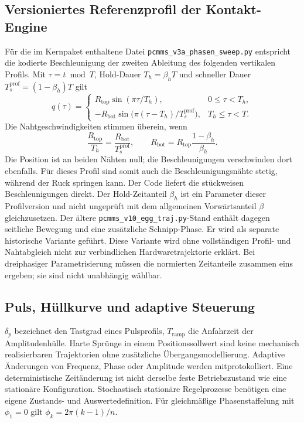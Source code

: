 \documentclass[11pt,a4paper]{article}
\begin{document}
\subsection{Versioniertes Referenzprofil der Kontakt-Engine}\label{sec:refprofil}
Für die im Kernpaket enthaltene Datei \texttt{pcmms\_v3a\_phasen\_sweep.py} entspricht die kodierte Beschleunigung der zweiten Ableitung des folgenden vertikalen Profils. Mit $\tau=t\bmod T$, Hold-Dauer $T_h=\beta_hT$ und schneller Dauer $T_s^{\mathrm{prof}}=(1-\beta_h)T$ gilt
\[
q(\tau)=\begin{cases}
R_{\mathrm{top}}\sin(\pi\tau/T_h),&0\le\tau<T_h,\\
-R_{\mathrm{bot}}\sin\bigl(\pi(\tau-T_h)/T_s^{\mathrm{prof}}\bigr),&T_h\le\tau<T.
\end{cases}
\]
Die Nahtgeschwindigkeiten stimmen überein, wenn
\[
\frac{R_{\mathrm{top}}}{T_h}=\frac{R_{\mathrm{bot}}}{T_s^{\mathrm{prof}}},\qquad
R_{\mathrm{bot}}=R_{\mathrm{top}}\frac{1-\beta_h}{\beta_h}.
\]
Die Position ist an beiden Nähten null; die Beschleunigungen verschwinden dort ebenfalls. Für dieses Profil sind somit auch die Beschleunigungsnähte stetig, während der Ruck springen kann. Der Code liefert die stückweisen Beschleunigungen direkt. Der Hold-Zeitanteil $\beta_h$ ist ein Parameter dieser Profilversion und nicht ungeprüft mit dem allgemeinen Vorwärtsanteil $\beta$ gleichzusetzen.
Der ältere \texttt{pcmms\_v10\_egg\_traj.py}-Stand enthält dagegen seitliche Bewegung und eine zusätzliche Schnipp-Phase. Er wird als separate historische Variante geführt. Diese Variante wird ohne vollständigen Profil- und Nahtabgleich nicht zur verbindlichen Hardwaretrajektorie erklärt. Bei dreiphasiger Parametrisierung müssen die normierten Zeitanteile zusammen eins ergeben; sie sind nicht unabhängig wählbar.

\subsection{Puls, Hüllkurve und adaptive Steuerung}
$\delta_p$ bezeichnet den Tastgrad eines Pulsprofils, $T_{\mathrm{ramp}}$ die Anfahrzeit der Amplitudenhülle. Harte Sprünge in einem Positionssollwert sind keine mechanisch realisierbaren Trajektorien ohne zusätzliche Übergangsmodellierung.
Adaptive Änderungen von Frequenz, Phase oder Amplitude werden mitprotokolliert. Eine deterministische Zeitänderung ist nicht derselbe feste Betriebszustand wie eine stationäre Konfiguration. Stochastisch stationäre Regelprozesse benötigen eine eigene Zustands- und Auswertedefinition. Für gleichmäßige Phasenstaffelung mit $\phi_1=0$ gilt $\phi_k=2\pi(k-1)/n$.
\end{document}
